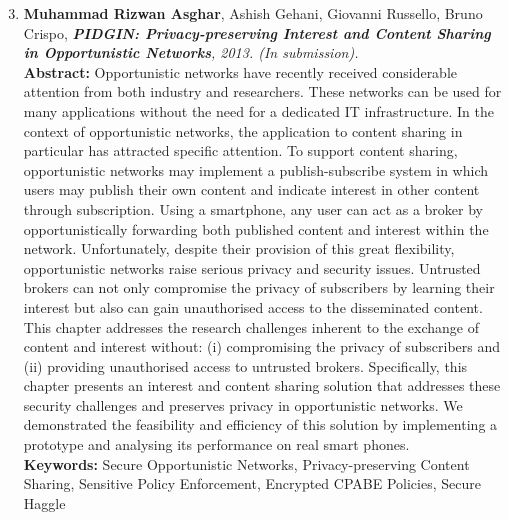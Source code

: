 \documentclass[epsfig,a4paper,11pt,titlepage]{book}
\numberwithin{algorithm}{chapter}
\begin{document}
\begin{enumerate}\setcounter{enumi}{2}
  
  \item \textbf{Muhammad Rizwan Asghar}, Ashish Gehani, Giovanni Russello, Bruno Crispo, \textit{\textbf{\gls{PIDGIN}: Privacy-preserving Interest and Content Sharing in Opportunistic Networks}, 2013. (In submission).} \vspace{3mm} \\
\textbf{Abstract:} Opportunistic networks have recently received considerable attention from both industry and researchers. These networks can be used for many applications without the need for a dedicated \gls{IT} infrastructure. In the context of opportunistic networks, the application to content sharing in particular has attracted specific attention. To support content sharing, opportunistic networks may implement a publish-subscribe system in which users may publish their own content and indicate interest in other content through subscription. Using a smartphone, any user can act as a broker by opportunistically forwarding both published content and interest within the network. Unfortunately, despite their provision of this great flexibility, opportunistic networks raise serious privacy and security issues. Untrusted brokers can not only compromise the privacy of subscribers by learning their interest but also can gain unauthorised access to the disseminated content. This chapter addresses the research challenges inherent to the exchange of content and interest without: (i) compromising the privacy of subscribers and (ii) providing unauthorised access to untrusted brokers. Specifically, this chapter presents an interest and content sharing solution that addresses these security challenges and preserves privacy in opportunistic networks. We demonstrated the feasibility and efficiency of this solution by implementing a prototype and analysing its performance on real smart phones. \vspace{3mm} \\
\textbf{Keywords:} Secure Opportunistic Networks, Privacy-preserving Content Sharing, Sensitive Policy Enforcement, Encrypted \acrshort{CPABE} Policies, Secure Haggle
  

\end{enumerate}
\end{document}
